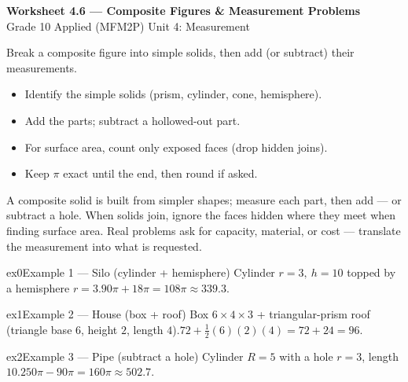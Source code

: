 \documentclass[11pt]{article}
\begin{document}
\begin{center}
{\LARGE\bfseries\color{titleblue}Worksheet 4.6 --- Composite Figures \& Measurement Problems}\\[2pt]
{\small Grade 10 Applied (MFM2P) \textperiodcentered{} Unit 4: Measurement}
\end{center}

\begin{ideabox}
Break a composite figure into simple solids, then add (or subtract) their measurements.
\begin{itemize}[leftmargin=*,itemsep=2pt]
  \item Identify the simple solids (prism, cylinder, cone, hemisphere).
  \item Add the parts; subtract a hollowed-out part.
  \item For surface area, count only exposed faces (drop hidden joins).
  \item Keep $\pi$ exact until the end, then round if asked.
\end{itemize}
\end{ideabox}

\begin{learnbox}
A composite solid is built from simpler shapes; measure each part, then add — or subtract a hole.
When solids join, ignore the faces hidden where they meet when finding surface area.
Real problems ask for capacity, material, or cost — translate the measurement into what is requested.
\end{learnbox}


\begin{example}{ex0}{Example 1 --- Silo (cylinder + hemisphere)}
Cylinder $r=3,\ h=10$ topped by a hemisphere $r=3$.\soln $90\pi+18\pi=108\pi\approx339.3$.
\end{example}

\begin{example}{ex1}{Example 2 --- House (box + roof)}
Box $6\times4\times3$ + triangular-prism roof (triangle base $6$, height $2$, length $4$).\soln $72+\tfrac12(6)(2)(4)=72+24=96$.
\end{example}

\begin{example}{ex2}{Example 3 --- Pipe (subtract a hole)}
Cylinder $R=5$ with a hole $r=3$, length $10$.\soln $250\pi-90\pi=160\pi\approx502.7$.
\end{example}
\end{document}
